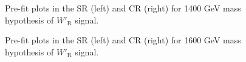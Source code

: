 \begin{figure}[H]
  \centering
  \caption{Pre-fit plots in the SR (left) and CR (right) for 1400 GeV mass hypothesis of $W'_{\text{R}}$ signal.}
  \label{fig:Prefit_WpRH1400_Asimov}
\end{figure}
\begin{figure}[H]
  \centering
  \caption{Pre-fit plots in the SR (left) and CR (right) for 1600 GeV mass hypothesis of $W'_{\text{R}}$ signal.}
  \label{fig:Prefit_WpRH1600_Asimov}
\end{figure}
